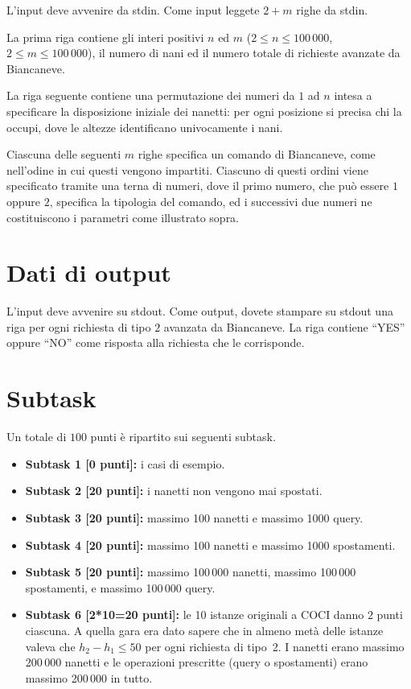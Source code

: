\documentclass[a4paper,11pt]{article}
\begin{document}
L'input deve avvenire da stdin.
Come input leggete $2+m$ righe da stdin.

La prima riga contiene gli interi positivi $n$ ed $m$
($2\leq n \leq 100\,000$, $2\leq m \leq 100\,000$),
il numero di nani ed il numero totale di richieste avanzate da Biancaneve.

La riga seguente contiene una permutazione dei numeri da $1$ ad $n$
intesa a specificare la disposizione iniziale dei nanetti:
per ogni posizione si precisa chi la occupi, dove le altezze identificano univocamente i nani. 

Ciascuna delle seguenti $m$ righe specifica un comando di Biancaneve,
come nell'odine in cui questi vengono impartiti.
Ciascuno di questi ordini viene specificato tramite una terna di numeri,
dove il primo numero, che pu\`o essere $1$ oppure $2$, specifica la tipologia del comando, ed i successivi due numeri ne costituiscono i parametri come illustrato sopra. 


\section*{Dati di output}
  L'input deve avvenire su stdout.
  Come output, dovete stampare su stdout una riga per ogni richiesta di tipo $2$
  avanzata da Biancaneve. La riga contiene ``YES'' oppure ``NO'' come risposta
  alla richiesta che le corrisponde.
  
\section*{Subtask}
  Un totale di $100$ punti \`e ripartito sui seguenti subtask.
  \begin{itemize}
    \item \textbf{Subtask 1 [0 punti]:} i casi di esempio.
    \item \textbf{Subtask 2 [20 punti]:} i nanetti non vengono mai spostati.
    \item \textbf{Subtask 3 [20 punti]:} massimo 100 nanetti e massimo 1000 query.
    \item \textbf{Subtask 4 [20 punti]:} massimo 100 nanetti e massimo 1000 spostamenti.
    \item \textbf{Subtask 5 [20 punti]:} massimo 100\,000 nanetti, massimo 100\,000 spostamenti, e massimo 100\,000 query.
    \item \textbf{Subtask 6 [2*10=20 punti]:} le 10 istanze originali a COCI danno $2$ punti ciascuna. A quella gara era dato sapere che in almeno metà delle istanze valeva che $h_2-h_1\leq 50$ per ogni richiesta di tipo~2. I nanetti erano massimo 200\,000 nanetti e le operazioni prescritte (query o spostamenti) erano massimo 200\,000 in tutto. 
  \end{itemize}
\end{document}

